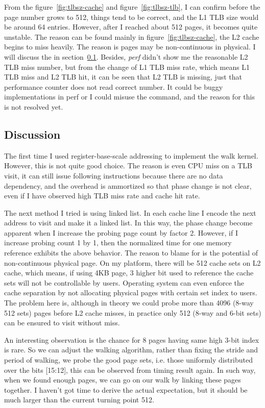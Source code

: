 From the figure~\ref{fig:tlbsz-cache} and figure~\ref{fig:tlbsz-tlb}, I can
confirm before the page number grows to 512, things tend to be correct, and the
L1 TLB size would be around 64 entries. However, after I reached about 512
pages, it becomes quite unstable. The reason can be found mainly in
figure~\ref{fig:tlbsz-cache}, the L2 cache begins to miss heavily.  The reason
is pages may be non-continuous in physical. I will discuss the in
section~\ref{subsec:tlb-discus}. Besides, \emph{perf} didn't show me the reasonable
L2 TLB miss number, but from the change of L1 TLB miss rate, which means L1 TLB
miss and L2 TLB hit, it can be seen that L2 TLB is missing, just that performance
counter does not read correct number. It could be buggy implementations in perf or
I could misuse the command, and the reason for this is not resolved yet.

\subsection{Discussion}
\label{subsec:tlb-discus}
The first time I used register-base-scale addressing to implement the walk
kernel. However, this is not quite good choice. The reason is even CPU miss
on a TLB visit, it can still issue following instructions because there are
no data dependency, and the overhead is ammortized so that phase change is
not clear, even if I have observed high TLB miss rate and cache hit rate.

The next method I tried is using linked list. In each cache line I encode the
next address to visit and make it a linked list. In this way, the phase change
become apparent when I increase the probing page count by factor 2. However, if
I increase probing count 1 by 1, then the normalized time for one memory
reference exhibits the above behavior. The reason to blame for is the potential
of non-continuous physical page. On my platform, there will be 512 cache sets
on L2 cache, which means, if using 4KB page, 3 higher bit used to reference
the cache sets will not be controllable by users. Operating system can even
enforce the cache separation by not allocating physical pages with certain
set index to users. The problem here is, although in theory we could probe
more than 4096 (8-way 512 sets) pages before L2 cache misses, in practice
only 512 (8-way and 6-bit sets) can be ensured to visit without miss.

An interesting observation is the chance for 8 pages having same high 3-bit
index is rare. So we can adjust the walking algorithm, rather than fixing the
stride and period of walking, we probe the good page sets, i.e. those uniformly
distributed over the bits [15:12], this can be observed from timing result
again. In such way, when we found enough pages, we can go on our walk by linking
these pages together. I haven't got time to derive the actual expectation, but
it should be much larger than the current turning point 512.


